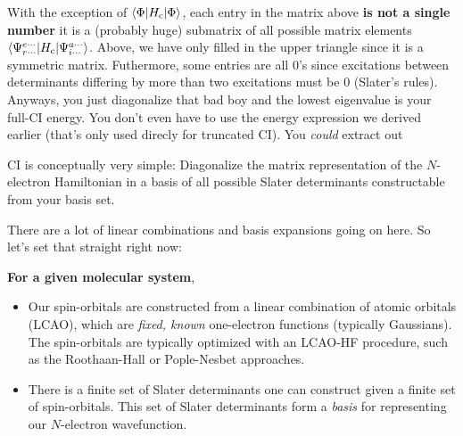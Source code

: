 \documentclass{article}
\newcommand{\Ecorr}{E_{\mathrm{corr}}}
\newcommand{\Hc}{H_{\mathrm{c}}}
\begin{document}
With the exception of $\braket{\Phi|\Hc|\Phi}$, each entry in the matrix above \textbf{is not a single number} it is a (probably huge) 
    submatrix of all possible matrix elements $\braket{\Psi_{r \cdots}^{e \cdots} | \Hc | \Psi_{i \cdots}^{a \cdots}  }$.
Above, we have only filled in the upper triangle since it is a symmetric matrix. 
Futhermore, some entries are all 0's since excitations between determinants differing by more than two excitations must be 0 (Slater's rules).
Anyways, you just diagonalize that bad boy and the lowest eigenvalue is your full-CI energy. 
You don't even have to use the energy expression we derived earlier (that's only used direcly for truncated CI).
You \textit{could} extract out 





%
%
%
%



CI is conceptually very simple: Diagonalize the matrix representation of the $N$-electron Hamiltonian in a basis of all possible Slater determinants constructable from your basis set.

There are a lot of linear combinations and basis expansions going on here. So let's set that straight right now:

\textbf{For a given molecular system},
\begin{itemize}
\item Our spin-orbitals are constructed from a linear combination of atomic orbitals (LCAO), which are \textit{fixed, known} one-electron functions (typically Gaussians). 
The spin-orbitals are typically optimized with an LCAO-HF procedure, such as the Roothaan-Hall or Pople-Nesbet approaches. 
\item There is a finite set of Slater determinants one can construct given a finite set of spin-orbitals. This set of Slater determinants form a \textit{basis} for representing our $N$-electron wavefunction.
\end{itemize}
\end{document}
